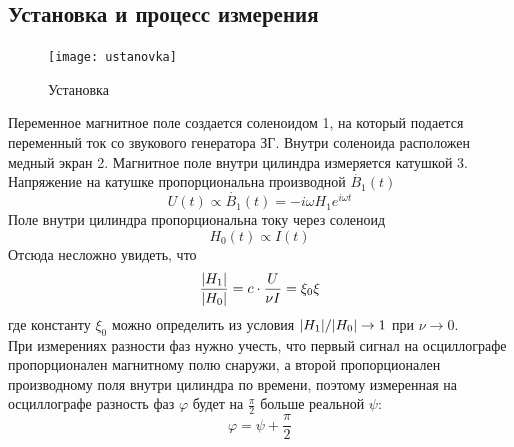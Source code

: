\documentclass[a4paper,12pt]{article}
\begin{document}
\newpage 	
\subsection{Установка и процесс измерения}
\begin{figure}
    \begin{center}
        \texttt{[image: ustanovka]}
    \end{center}
    \caption{Установка}\label{fig:ustanovka}
\end{figure}

Переменное магнитное поле создается соленоидом 1, на который подается переменный ток со звукового генератора ЗГ. Внутри соленоида расположен медный экран 2. Магнитное поле внутри цилиндра измеряется катушкой 3. Напряжение на катушке пропорциональна производной $\dot{B_1}(t)$
\begin{equation*}
    U(t) \propto \dot{B_1}(t) = -i\omega H_1 e^{i\omega t}
\end{equation*}
Поле внутри цилиндра пропорциональна току через соленоид
\begin{equation*}
    H_0(t) \propto I(t)
\end{equation*}
Отсюда несложно увидеть, что
\begin{equation}
    \frac{\abs{H_1}}{\abs{H_0}} = c \cdot \frac{U}{\nu I} = \xi_0 \xi
    \label{eq:otnoshenie_amplitud}
\end{equation}
где константу  $\xi_0$ можно определить из условия $\abs{H_1}/\abs{H_0} \rightarrow 1$ при
$\nu \rightarrow 0$.\\

При измерениях разности фаз нужно учесть, что первый сигнал на осциллографе
пропорционален магнитному полю снаружи, а второй пропорционален производному
поля внутри цилиндра по времени, поэтому измеренная на осциллографе разность фаз $\varphi$ будет на $\frac{\pi}{2}$ больше реальной $\psi$:
\[\varphi = \psi + \frac{\pi}{2}\]
\end{document}
